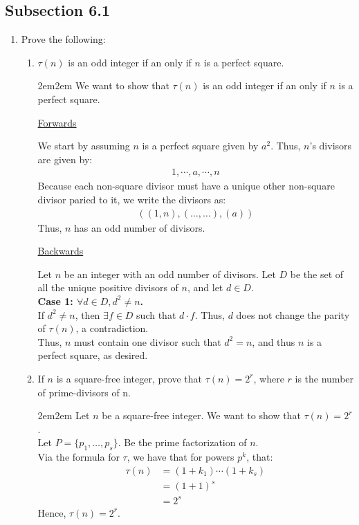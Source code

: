 \documentclass[10pt,oneside]{book}
\newcommand{\gspc}{\vspace{0.13cm}} %
\newcommand{\gline}{\gspc\\} %
\newcommand{\centerit}[1]{{\begin{center} #1 \end{center}}}
\newcommand{\ul}[1]{\underline{#1}}
\let\endoldproof\endproof
\renewenvironment{proof}[1][\proofname]
  {\vspace{0.2cm}\begin{adjustwidth}{2em}{2em}
   \oldproof[#1]}
  {\endoldproof
\end{adjustwidth}}
\begin{document}
\subsection*{Subsection 6.1}
\begin{enumerate}
	\item [7.] Prove the following:
	\begin{enumerate}
		\item $\tau (n)$ is an odd integer if an only if $n$ is a perfect square. 
		\begin{proof}
			We want to show that $\tau (n)$ is an odd integer if an only if $n$ is a perfect square.
			\centerit{\ul{Forwards}}
			We start by assuming $n$ is a perfect square given by $a^2$. Thus, $n$'s divisors are given by:
			\begin{align*}
				1 , \cdots , a , \cdots , n
			\end{align*}
			Because each non-square divisor must have a unique other non-square divisor paried to it, we write the divisors as:
			\begin{align*}
				((1, n), (\ldots, \ldots), (a))
			\end{align*}
			Thus, $n$ has an odd number of divisors. 
			\centerit{\ul{Backwards}}
			Let $n$ be an integer with an odd number of divisors. Let $D$ be the set of all the unique positive divisors of $n$, and let $d\in D$. \gline
			\textbf{Case 1: $\forall d\in D, d^2\ne n$.} \\
			If $d^2\ne n$, then $\exists f\in D$ such that $d\cdot f$. Thus, $d$ does not change the parity of $\tau(n)$, a contradiction.\gline
			Thus, $n$ must contain one divisor such that $d^2 = n$, and thus $n$ is a perfect square, as desired. 
		\end{proof}
		\item If $n$ is a square-free integer, prove that $\tau(n) = 2^r$, where $r$ is the number of prime-divisors of n. 
		\begin{proof}
			Let $n$ be a square-free integer. We want to show that $\tau(n) = 2^r$.\\
			Let $P = \{p_1,\ldots, p_s\}$. Be the prime factorization of $n$. \\
			Via the formula for $\tau$, we have that for powers $p^k$, that:
			\begin{align*}
				\tau(n) &= (1+k_1)\cdots (1+k_s)\\
				&= (1+1)^s\\
				&= 2^s
			\end{align*}
			Hence, $\tau(n) = 2^r$. 
		\end{proof}

\end{enumerate}
\end{enumerate}
\end{document}
